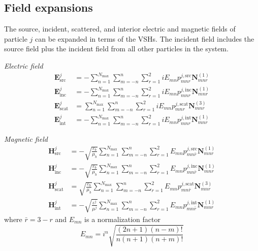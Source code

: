 \documentclass[11pt]{article}
\begin{document}
\subsection{Field expansions}
The source, incident, scattered, and interior electric and magnetic fields of particle $j$ can be expanded in terms of the VSHs.
The incident field includes the source field plus the incident field from all other particles in the system.

\hfill

\textit{Electric field}
\begin{subequations}
\begin{align}
    \boldsymbol{E}_\text{src}^j &= - \sum_{n=1}^{N_\text{max}} \sum_{m=-n}^{n} \sum_{r=1}^2
    iE_{mn} p_{mnr}^{j,\text{src}} \boldsymbol{N}_{mnr}^{(1)} \\
    \boldsymbol{E}_\text{inc}^j &= - \sum_{n=1}^{N_\text{max}} \sum_{m=-n}^{n} \sum_{r=1}^2
    iE_{mn} p_{mnr}^{j,\text{inc}} \boldsymbol{N}_{mnr}^{(1)} \\
    \boldsymbol{E}_\text{scat}^j &= \sum_{n=1}^{N_\text{max}} \sum_{m=-n}^{n} \sum_{r=1}^2
    iE_{mn} p_{mnr}^{j,\text{scat}} \boldsymbol{N}_{mnr}^{(3)} \\
    \boldsymbol{E}_\text{int}^j &= - \sum_{n=1}^{N_\text{max}} \sum_{m=-n}^{n} \sum_{r=1}^2
    iE_{mn} p_{mnr}^{j,\text{int}} \boldsymbol{N}_{mnr}^{(1)}
\end{align}
\label{eqn:electric_field_expansion}
\end{subequations}

\textit{Magnetic field}
\begin{subequations}
\begin{align}
    \boldsymbol{H}_\text{src}^j &= - \sqrt{\frac{\varepsilon_b}{\mu_b}} \sum_{n=1}^{N_\text{max}} \sum_{m=-n}^{n} \sum_{r=1}^2
    E_{mn} p_{mn\bar r}^{j,\text{src}} \boldsymbol{N}_{mnr}^{(1)} \\
    \boldsymbol{H}_\text{inc}^j &= - \sqrt{\frac{\varepsilon_b}{\mu_b}} \sum_{n=1}^{N_\text{max}} \sum_{m=-n}^{n} \sum_{r=1}^2
    E_{mn} p_{mn\bar r}^{j,\text{inc}} \boldsymbol{N}_{mnr}^{(1)} \\
    \boldsymbol{H}_\text{scat}^j &= \sqrt{\frac{\varepsilon_b}{\mu_b}} \sum_{n=1}^{N_\text{max}} \sum_{m=-n}^{n} \sum_{r=1}^2
    E_{mn} p_{mn\bar r}^{j,\text{scat}} \boldsymbol{N}_{mnr}^{(3)} \\
    \boldsymbol{H}_\text{int}^j &= - \sqrt{\frac{\varepsilon^j}{\mu^j}} \sum_{n=1}^{N_\text{max}} \sum_{m=-n}^{n} \sum_{r=1}^2
    E_{mn} p_{mn\bar r}^{j,\text{int}} \boldsymbol{N}_{mnr}^{(1)}
\end{align}
\label{eqn:magnetic_field_expansion}
\end{subequations}
where $\bar r = 3-r$ and $E_{mn}$ is a normalization factor
\begin{equation}
    E_{mn} = i^n \sqrt{\frac{(2n+1)(n-m)!}{n(n+1)(n+m)!}}
\end{equation}
\end{document}
